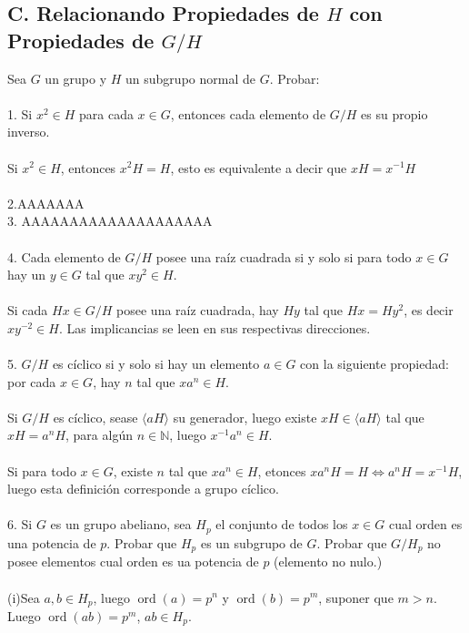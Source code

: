 \documentclass{article}
\begin{document}
\subsection*{C. Relacionando Propiedades de $H$ con Propiedades de $G/H$}
Sea $G$ un grupo y $H$ un subgrupo normal de $G$. Probar:
\\
\\
1. Si $x^{2} \in H$ para cada $x \in G$, entonces cada elemento de $G/H$ es su propio inverso.
\\
\\
Si $x^{2} \in H$, entonces $x^{2}H=H$, esto es equivalente a decir que $xH=x^{-1}H$
\\
\\
2.AAAAAAA
\\
3. AAAAAAAAAAAAAAAAAAAA
\\
\\
4. Cada elemento de $G/H$ posee una raíz cuadrada si y solo si para todo $x \in G$ hay un $y \in G$ tal que $xy^{2} \in H$.
\\
\\
Si cada $Hx \in G/H$ posee una raíz cuadrada, hay $Hy$ tal que $Hx=Hy^{2}$, es decir $xy^{-2} \in H$. Las implicancias se leen en sus respectivas direcciones.
\\
\\
5. $G/H$ es cíclico si y solo si hay un elemento $a \in G$ con la siguiente propiedad: por cada $x \in G$, hay $n$ tal que $xa^{n} \in H$.
\\
\\
Si $G/H$ es cíclico, sease $\langle aH \rangle$ su generador, luego existe $xH \in \langle aH \rangle$ tal que $xH=a^{n}H$, para algún $n \in \mathbb{N}$, luego $x^{-1}a^{n} \in H$.
\\
\\
Si para todo $x \in G$, existe $n$ tal que $xa^{n} \in H$, etonces $xa^{n}H=H \Longleftrightarrow a^{n}H=x^{-1}H$, luego esta definición corresponde a grupo cíclico.
\\
\\
6. Si $G$ es un grupo abeliano, sea $H_p$ el conjunto de todos los $x \in G$ cual orden es una potencia de $p$. Probar que $H_p$ es un subgrupo de $G$. Probar que $G/H_p$ no posee elementos cual orden es ua potencia de $p$ (elemento no nulo.)
\\
\\
(i)Sea $a,b \in H_p$, luego $\operatorname{ord}{(a)}=p^{n}$ y $\operatorname{ord}{(b)}=p^{m}$, suponer que $m>n$. Luego $\operatorname{ord}{(ab)}=p^{m}$, $ab \in H_p$.
\\
\end{document}

